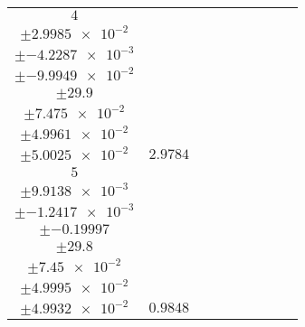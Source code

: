 \documentclass[8pt]{article}
\begin{document}
\begin{longtable}[l]{c c c c c c c c c}
$\num{4}$ & \begin{tabular}[c]{@{}c@{}}$\num{2.9985}$ \\ $\pm\num{2.9985e-2}$\end{tabular} & \begin{tabular}[c]{@{}c@{}}$\num{-0.42287}$ \\ $\pm\num{-4.2287e-3}$\end{tabular} & \begin{tabular}[c]{@{}c@{}}$\num{-9.9949}$ \\ $\pm\num{-9.9949e-2}$\end{tabular} & \begin{tabular}[c]{@{}c@{}}$\num{2.99e+3}$ \\ $\pm\num{29.9}$\end{tabular} & \begin{tabular}[c]{@{}c@{}}$\num{7.475}$ \\ $\pm\num{7.475e-2}$\end{tabular} & \begin{tabular}[c]{@{}c@{}}$\num{4.9961}$ \\ $\pm\num{4.9961e-2}$\end{tabular} & \begin{tabular}[c]{@{}c@{}}$\num{5.0025}$ \\ $\pm\num{5.0025e-2}$\end{tabular} & $\num{2.9784}$\\
$\num{5}$ & \begin{tabular}[c]{@{}c@{}}$\num{0.99138}$ \\ $\pm\num{9.9138e-3}$\end{tabular} & \begin{tabular}[c]{@{}c@{}}$\num{-0.12417}$ \\ $\pm\num{-1.2417e-3}$\end{tabular} & \begin{tabular}[c]{@{}c@{}}$\num{-19.997}$ \\ $\pm\num{-0.19997}$\end{tabular} & \begin{tabular}[c]{@{}c@{}}$\num{2.98e+3}$ \\ $\pm\num{29.8}$\end{tabular} & \begin{tabular}[c]{@{}c@{}}$\num{7.45}$ \\ $\pm\num{7.45e-2}$\end{tabular} & \begin{tabular}[c]{@{}c@{}}$\num{4.9995}$ \\ $\pm\num{4.9995e-2}$\end{tabular} & \begin{tabular}[c]{@{}c@{}}$\num{4.9932}$ \\ $\pm\num{4.9932e-2}$\end{tabular} & $\num{0.9848}$\\
\bottomrule
\end{longtable}
\end{document}
